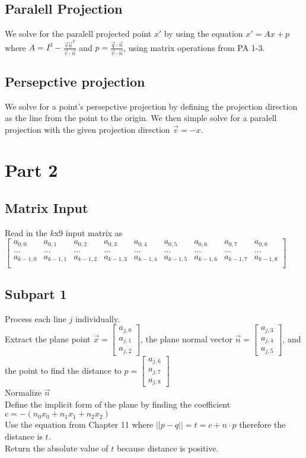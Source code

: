 \documentclass[11pt]{article}
\begin{document}
\subsection*{Paralell Projection}
	We solve for the paralell projected point $x'$ by using the equation $x'=Ax+p$ where $A=I^3-\frac{\vec{v}\vec{n}^T}{\vec{v}\cdot\vec{n}}$ and $p=\frac{\vec{q}\cdot\vec{n}}{\vec{v}\cdot\vec{n}}$, using matrix operations from PA 1-3.
\subsection*{Persepctive projection}
	We solve for a point's persepctive projection by defining the projection direction as the line from the point to the origin.
	We then simple solve for a paralell projection with the given projection direction $\vec{v}=-x$.

\section*{Part 2}
\subsection*{Matrix Input}
Read in the $k$x9 input matrix as $
	\begin{bmatrix}
	a_{0,0} & a_{0,1} &a_{0,2}&a_{0,3}&a_{0,4}&a_{0,5}&a_{0,6}&a_{0,7}&a_{0,8}\\
	...&...&...&...&...&...&...&...&...\\
	a_{k-1,0}&a_{k-1,1}&a_{k-1,2}&a_{k-1,3}& a_{k-1,4}&a_{k-1,5}&a_{k-1,6}&a_{k-1,7}&a_{k-1,8}\\
	\end{bmatrix}$\\
\subsection*{Subpart 1}

	Process each line $j$ individually.\\
	Extract the plane point $\vec{x} = \begin{bmatrix} a_{j,0} \\a_{j,1} \\a_{j,2}\end{bmatrix}$,
	the plane normal vector $\vec{n} = \begin{bmatrix} a_{j,3} \\a_{j,4} \\a_{j,5}\end{bmatrix}$,
	and the point to find the distance to  $p = \begin{bmatrix} a_{j,6} \\a_{j,7} \\a_{j,8}\end{bmatrix}$\\
	Normalize $\vec{n}$\\
	Define the implicit form of the plane by finding the coefficient $c = -(n_0x_0 + n_1x_1 + n_2x_2)$\\
	Use the equation from Chapter 11 where $||p-q|| = t = c + n\cdot p$ therefore the distance is $t$.\\
	Return the absolute value of $t$ because distance is positive.
\end{document}
